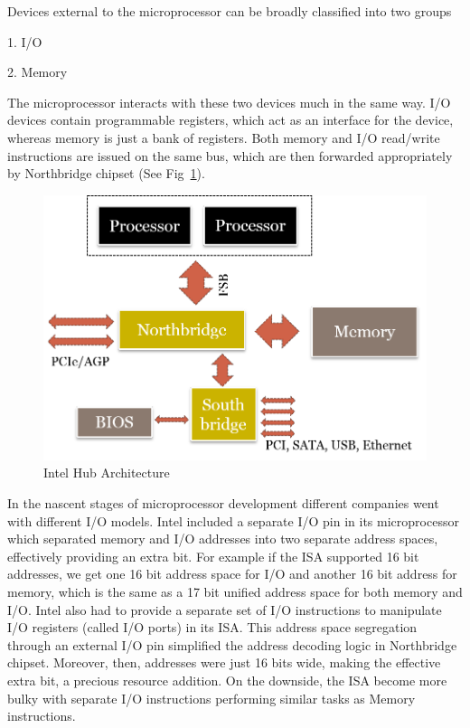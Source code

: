 Devices external to the microprocessor can be broadly classified into two groups

1. I/O

2. Memory

The microprocessor interacts with these two devices much in the same way. I/O devices contain programmable registers, which act as an interface for the device, whereas memory is just a bank of registers. Both memory and I/O read/write instructions are issued on the same bus, which are then forwarded appropriately by Northbridge chipset (See Fig~\ref{fig:intel_arch}).

\setlength{\belowcaptionskip}{-10pt}

\begin{figure}[H]
  \centering
  \includegraphics[scale=0.6]{figures/intelhubarchi.png}
  \caption{Intel Hub Architecture}
  \label{fig:intel_arch}
\end{figure}

In the nascent stages of microprocessor development different companies went with different I/O models. Intel included a separate I/O pin in its microprocessor which separated memory and I/O addresses into two separate address spaces, effectively providing an extra bit. For example if the ISA supported 16 bit addresses, we get one 16 bit address space for I/O and another 16 bit address for memory, which is the same as a 17 bit unified address space for both memory and I/O. Intel also had to provide a separate set of I/O instructions to manipulate I/O registers (called I/O ports) in its ISA. This address space segregation through an external I/O pin simplified the address decoding logic in Northbridge chipset. Moreover, then, addresses were just 16 bits wide, making the effective extra bit, a precious resource addition. On the downside, the ISA become more bulky with separate I/O instructions performing similar tasks as Memory instructions.


